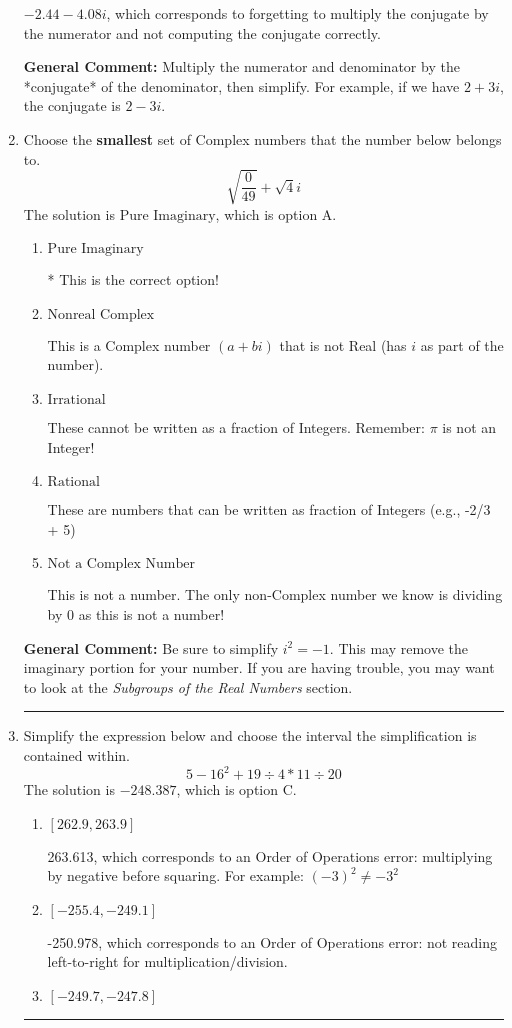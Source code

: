 \documentclass{extbook}[14pt]
\newcommand{\litem}[1]{\item #1

\rule{\textwidth}{0.4pt}}
\begin{document}
\begin{enumerate}
{\begin{enumerate}[label=\Alph*.]
 $-2.44  - 4.08 i$, which corresponds to forgetting to multiply the conjugate by the numerator and not computing the conjugate correctly.
\end{enumerate}

\textbf{General Comment:} Multiply the numerator and denominator by the *conjugate* of the denominator, then simplify. For example, if we have $2+3i$, the conjugate is $2-3i$.
}
\litem{
Choose the \textbf{smallest} set of Complex numbers that the number below belongs to.
\[ \sqrt{\frac{0}{49}}+\sqrt{4}i \]The solution is \( \text{Pure Imaginary} \), which is option A.\begin{enumerate}[label=\Alph*.]
\item \( \text{Pure Imaginary} \)

* This is the correct option!
\item \( \text{Nonreal Complex} \)

This is a Complex number $(a+bi)$ that is not Real (has $i$ as part of the number).
\item \( \text{Irrational} \)

These cannot be written as a fraction of Integers. Remember: $\pi$ is not an Integer!
\item \( \text{Rational} \)

These are numbers that can be written as fraction of Integers (e.g., -2/3 + 5)
\item \( \text{Not a Complex Number} \)

This is not a number. The only non-Complex number we know is dividing by 0 as this is not a number!
\end{enumerate}

\textbf{General Comment:} Be sure to simplify $i^2 = -1$. This may remove the imaginary portion for your number. If you are having trouble, you may want to look at the \textit{Subgroups of the Real Numbers} section.
}
\litem{
Simplify the expression below and choose the interval the simplification is contained within.
\[ 5 - 16^2 + 19 \div 4 * 11 \div 20 \]The solution is \( -248.387 \), which is option C.\begin{enumerate}[label=\Alph*.]
\item \( [262.9, 263.9] \)

 263.613, which corresponds to an Order of Operations error: multiplying by negative before squaring. For example: $(-3)^2 \neq -3^2$
\item \( [-255.4, -249.1] \)

 -250.978, which corresponds to an Order of Operations error: not reading left-to-right for multiplication/division.
\item \( [-249.7, -247.8] \)


\end{enumerate}}
\end{enumerate}
\end{document}
